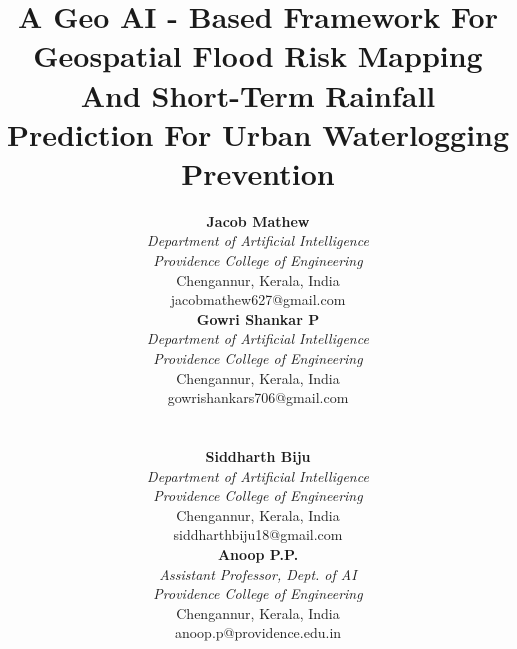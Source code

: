 \documentclass[conference]{IEEEtran}
\begin{document}
\title{A Geo AI - Based Framework For Geospatial Flood Risk Mapping And Short-Term Rainfall Prediction For Urban Waterlogging Prevention}

\author{
    \begin{minipage}{0.45\textwidth}
        \centering
        \textbf{Jacob Mathew} \\
        \textit{Department of Artificial Intelligence} \\
        \textit{Providence College of Engineering} \\
        Chengannur, Kerala, India \\
        jacobmathew627@gmail.com
    \end{minipage}
    \hfill
    \begin{minipage}{0.45\textwidth}
        \centering
        \textbf{Gowri Shankar P} \\
        \textit{Department of Artificial Intelligence} \\
        \textit{Providence College of Engineering} \\
        Chengannur, Kerala, India \\
        gowrishankars706@gmail.com
    \end{minipage}
    \vspace{0.7cm} \\
    \begin{minipage}{0.45\textwidth}
        \centering
        \textbf{Siddharth Biju} \\
        \textit{Department of Artificial Intelligence} \\
        \textit{Providence College of Engineering} \\
        Chengannur, Kerala, India \\
        siddharthbiju18@gmail.com
    \end{minipage}
    \hfill
    \begin{minipage}{0.45\textwidth}
        \centering
        \textbf{Anoop P.P.} \\
        \textit{Assistant Professor, Dept. of AI} \\
        \textit{Providence College of Engineering} \\
        Chengannur, Kerala, India \\
        anoop.p@providence.edu.in
    \end{minipage}
}

\maketitle
\end{document}
